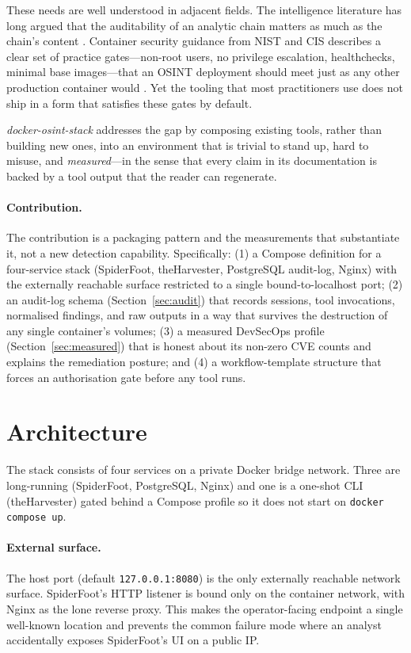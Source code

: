 \documentclass[conference,a4paper,10pt]{IEEEtran}
\begin{document}
These needs are well understood in adjacent fields. The intelligence
literature has long argued that the auditability of an analytic chain
matters as much as the chain's content \cite{heuer1999}. Container
security guidance from NIST and CIS describes a clear set of practice
gates---non-root users, no privilege escalation, healthchecks,
minimal base images---that an OSINT deployment should meet just as
any other production container would \cite{nist800190,cisdocker}.
Yet the tooling that most practitioners use does not ship in a form
that satisfies these gates by default.

\emph{docker-osint-stack} addresses the gap by composing existing
tools, rather than building new ones, into an environment that is
trivial to stand up, hard to misuse, and \emph{measured}---in the
sense that every claim in its documentation is backed by a tool
output that the reader can regenerate.

\paragraph{Contribution.}
The contribution is a packaging pattern and the measurements that
substantiate it, not a new detection capability. Specifically:
(1) a Compose definition for a four-service stack (SpiderFoot,
theHarvester, PostgreSQL audit-log, Nginx) with the externally
reachable surface restricted to a single bound-to-localhost port;
(2) an audit-log schema (Section~\ref{sec:audit}) that records
sessions, tool invocations, normalised findings, and raw outputs in
a way that survives the destruction of any single container's
volumes; (3) a measured DevSecOps profile (Section~\ref{sec:measured})
that is honest about its non-zero CVE counts and explains the
remediation posture; and (4) a workflow-template structure that
forces an authorisation gate before any tool runs.

\section{Architecture}
\label{sec:arch}

The stack consists of four services on a private Docker bridge
network. Three are long-running (SpiderFoot, PostgreSQL, Nginx) and
one is a one-shot CLI (theHarvester) gated behind a Compose profile so
it does not start on \verb|docker compose up|.

\paragraph{External surface.}
The host port (default \texttt{127.0.0.1:8080}) is the only externally
reachable network surface. SpiderFoot's HTTP listener is bound only
on the container network, with Nginx as the lone reverse proxy. This
makes the operator-facing endpoint a single well-known location and
prevents the common failure mode where an analyst accidentally
exposes SpiderFoot's UI on a public IP.
\end{document}
